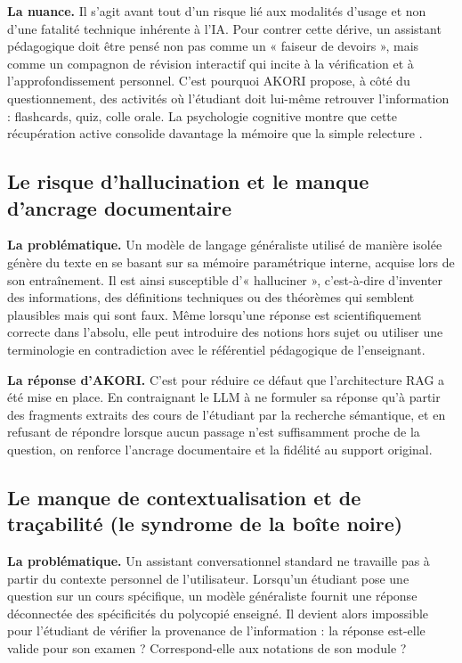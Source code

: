 \documentclass[12pt,a4paper,oneside]{report}
\begin{document}
\textbf{La nuance.} Il s'agit avant tout d'un risque lié aux modalités d'usage et non d'une fatalité technique inhérente à l'IA. Pour contrer cette dérive, un assistant pédagogique doit être pensé non pas comme un « faiseur de devoirs », mais comme un compagnon de révision interactif qui incite à la vérification et à l'approfondissement personnel. C'est pourquoi AKORI propose, à côté du questionnement, des activités où l'étudiant doit lui-même retrouver l'information : flashcards, quiz, colle orale. La psychologie cognitive montre que cette récupération active consolide davantage la mémoire que la simple relecture \cite{roediger2006testing}.

\subsection{Le risque d'hallucination et le manque d'ancrage documentaire}

\textbf{La problématique.} Un modèle de langage généraliste utilisé de manière isolée génère du texte en se basant sur sa mémoire paramétrique interne, acquise lors de son entraînement. Il est ainsi susceptible d'« halluciner », c'est-à-dire d'inventer des informations, des définitions techniques ou des théorèmes qui semblent plausibles mais qui sont faux. Même lorsqu'une réponse est scientifiquement correcte dans l'absolu, elle peut introduire des notions hors sujet ou utiliser une terminologie en contradiction avec le référentiel pédagogique de l'enseignant.

\textbf{La réponse d'AKORI.} C'est pour réduire ce défaut que l'architecture RAG a été mise en place. En contraignant le LLM à ne formuler sa réponse qu'à partir des fragments extraits des cours de l'étudiant par la recherche sémantique, et en refusant de répondre lorsque aucun passage n'est suffisamment proche de la question, on renforce l'ancrage documentaire et la fidélité au support original.

\subsection{Le manque de contextualisation et de traçabilité (le syndrome de la boîte noire)}

\textbf{La problématique.} Un assistant conversationnel standard ne travaille pas à partir du contexte personnel de l'utilisateur. Lorsqu'un étudiant pose une question sur un cours spécifique, un modèle généraliste fournit une réponse déconnectée des spécificités du polycopié enseigné. Il devient alors impossible pour l'étudiant de vérifier la provenance de l'information : la réponse est-elle valide pour son examen ? Correspond-elle aux notations de son module ?
\end{document}
